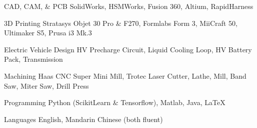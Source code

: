 


\begin{cvskills}


\cvskill
{CAD, CAM, \& PCB} %
{SolidWorks, HSMWorks, Fusion 360, Altium, RapidHarness} %


\cvskill
{3D Printing} %
{Stratasys Objet 30 Pro \& F270, Formlabs Form 3, MiiCraft 50, Ultimaker S5, Prusa i3 Mk.3} %

\cvskill
{Electric Vehicle Design}
{HV Precharge Circuit, Liquid Cooling Loop, HV Battery Pack, Transmission}


\cvskill
{Machining}
{Haas CNC Super Mini Mill, Trotec Laser Cutter, Lathe, Mill, Band Saw, Miter Saw, Drill Press}



\cvskill
{Programming} %
{Python (ScikitLearn \& Tensorflow), Matlab, Java, LaTeX} %

\cvskill
{Languages}
{English, Mandarin Chinese (both fluent)}


\end{cvskills}